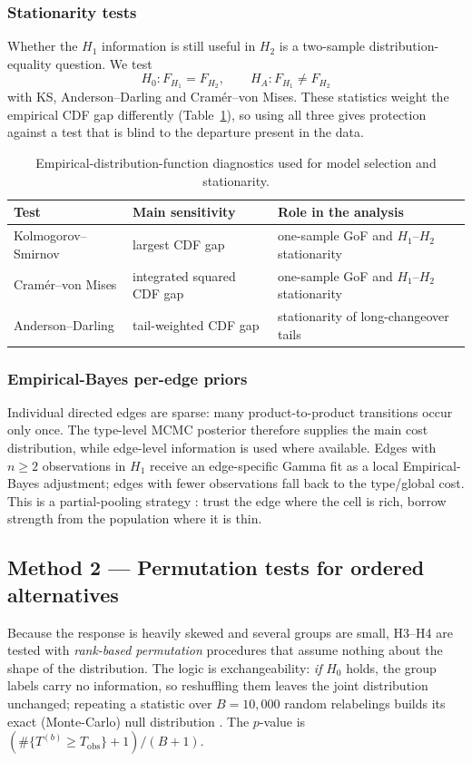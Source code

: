 \documentclass[11pt,a4paper]{article}
\begin{document}
\subsubsection{Stationarity tests}
Whether the $H_1$ information is still useful in $H_2$ is a two-sample
distribution-equality question. We test
\[
H_0:F_{H_1}=F_{H_2},\qquad H_A:F_{H_1}\neq F_{H_2}
\]
with KS, Anderson--Darling \cite{anderson1952} and Cram\'er--von Mises. These
statistics weight the empirical CDF gap differently (Table~\ref{tab:edftests}),
so using all three gives protection against a test that is blind to the departure
present in the data.

\begin{table}[H]\centering\small
\begin{tabular}{@{}p{3.2cm}p{4.2cm}p{5.3cm}@{}}
\toprule
Test & Main sensitivity & Role in the analysis \\
\midrule
Kolmogorov--Smirnov & largest CDF gap & one-sample GoF and $H_1$--$H_2$ stationarity \\
Cram\'er--von Mises & integrated squared CDF gap & one-sample GoF and $H_1$--$H_2$ stationarity \\
Anderson--Darling & tail-weighted CDF gap & stationarity of long-changeover tails \\
\bottomrule
\end{tabular}
\caption{Empirical-distribution-function diagnostics used for model selection
and stationarity.}
\label{tab:edftests}
\end{table}

\subsubsection{Empirical-Bayes per-edge priors}
Individual directed edges are sparse: many product-to-product transitions occur
only once. The type-level MCMC posterior therefore supplies the main cost
distribution, while edge-level information is used where available. Edges with
$n\ge2$ observations in $H_1$ receive an edge-specific Gamma fit as a local
Empirical-Bayes adjustment; edges with fewer observations fall back to the
type/global cost. This is a partial-pooling strategy \cite{gelman2013bda}: trust
the edge where the cell is rich, borrow strength from the population where it is
thin.

\subsection{Method 2 --- Permutation tests for ordered alternatives}\label{sec:m2}
Because the response is heavily skewed and several groups are small, H3--H4 are
tested with \emph{rank-based permutation} procedures that assume nothing about the
shape of the distribution. The logic is exchangeability: \emph{if} $H_0$ holds,
the group labels carry no information, so reshuffling them leaves the joint
distribution unchanged; repeating a statistic over $B=10{,}000$ random relabelings
builds its exact (Monte-Carlo) null distribution \cite{good2005permutation}. The
$p$-value is $(\#\{T^{(b)}\ge T_{\text{obs}}\}+1)/(B+1)$.
\end{document}
